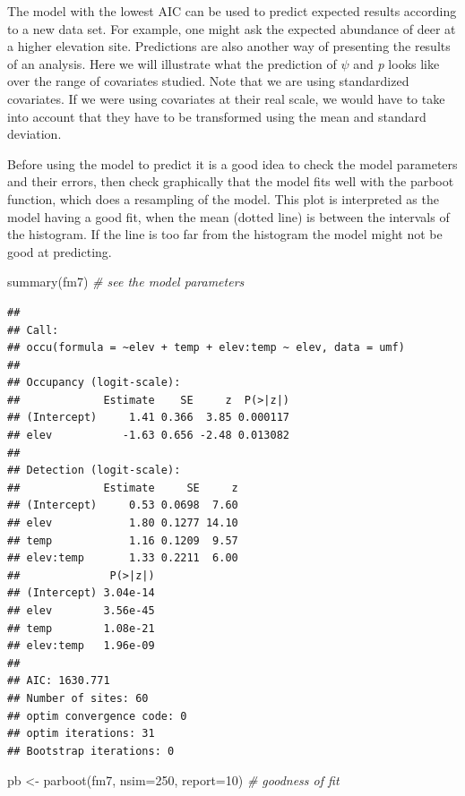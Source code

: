 \documentclass[
]{book}
\newenvironment{Shaded}{\begin{snugshade}}{\end{snugshade}}
\newcommand{\AttributeTok}[1]{\textcolor[rgb]{0.77,0.63,0.00}{#1}}
\newcommand{\CommentTok}[1]{\textcolor[rgb]{0.56,0.35,0.01}{\textit{#1}}}
\newcommand{\DecValTok}[1]{\textcolor[rgb]{0.00,0.00,0.81}{#1}}
\newcommand{\FunctionTok}[1]{\textcolor[rgb]{0.00,0.00,0.00}{#1}}
\newcommand{\NormalTok}[1]{#1}
\newcommand{\OtherTok}[1]{\textcolor[rgb]{0.56,0.35,0.01}{#1}}
\begin{document}
The model with the lowest AIC can be used to predict expected results according to a new data set. For example, one might ask the expected abundance of deer at a higher elevation site. Predictions are also another way of presenting the results of an analysis. Here we will illustrate what the prediction of \(\psi\) and \emph{p} looks like over the range of covariates studied. Note that we are using standardized covariates. If we were using covariates at their real scale, we would have to take into account that they have to be transformed using the mean and standard deviation.

Before using the model to predict it is a good idea to check the model parameters and their errors, then check graphically that the model fits well with the parboot function, which does a resampling of the model. This plot is interpreted as the model having a good fit, when the mean (dotted line) is between the intervals of the histogram. If the line is too far from the histogram the model might not be good at predicting.

\begin{Shaded}
\begin{Highlighting}[]
\FunctionTok{summary}\NormalTok{(fm7) }\CommentTok{\# see the model parameters}
\end{Highlighting}
\end{Shaded}

\begin{verbatim}
## 
## Call:
## occu(formula = ~elev + temp + elev:temp ~ elev, data = umf)
## 
## Occupancy (logit-scale):
##             Estimate    SE     z  P(>|z|)
## (Intercept)     1.41 0.366  3.85 0.000117
## elev           -1.63 0.656 -2.48 0.013082
## 
## Detection (logit-scale):
##             Estimate     SE     z
## (Intercept)     0.53 0.0698  7.60
## elev            1.80 0.1277 14.10
## temp            1.16 0.1209  9.57
## elev:temp       1.33 0.2211  6.00
##              P(>|z|)
## (Intercept) 3.04e-14
## elev        3.56e-45
## temp        1.08e-21
## elev:temp   1.96e-09
## 
## AIC: 1630.771 
## Number of sites: 60
## optim convergence code: 0
## optim iterations: 31 
## Bootstrap iterations: 0
\end{verbatim}

\begin{Shaded}
\begin{Highlighting}[]
\NormalTok{pb }\OtherTok{\textless{}{-}} \FunctionTok{parboot}\NormalTok{(fm7, }\AttributeTok{nsim=}\DecValTok{250}\NormalTok{, }\AttributeTok{report=}\DecValTok{10}\NormalTok{) }\CommentTok{\# goodness of fit}
\end{Highlighting}
\end{Shaded}
\end{document}
